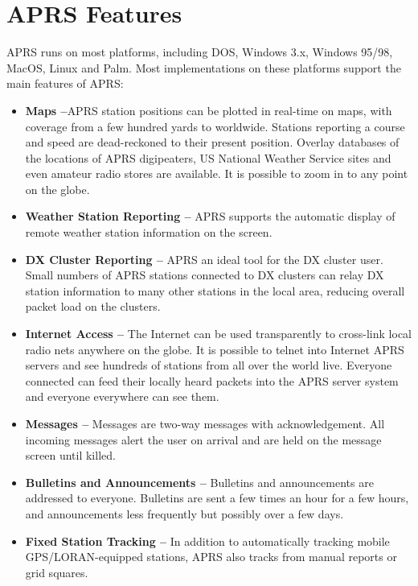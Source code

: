 \documentclass{scrreprt}[letter]
\begin{document}
\section{APRS Features}

APRS runs on most platforms, including DOS, Windows 3.x, Windows
95/98, MacOS, Linux and Palm. Most implementations on these platforms
support the main features of APRS:

\begin{itemize}

\item \textbf{Maps --}APRS station positions can be plotted in real-time on maps,
with coverage from a few hundred yards to worldwide. Stations reporting
a course and speed are dead-reckoned to their present position. Overlay
databases of the locations of APRS digipeaters, US National Weather
Service sites and even amateur radio stores are available. It is possible to
zoom in to any point on the globe.


\item \textbf{Weather Station Reporting --} APRS supports the automatic display of
remote weather station information on the screen.

\item \textbf{DX Cluster Reporting --} APRS an ideal tool for the DX cluster user.
Small numbers of APRS stations connected to DX clusters can relay DX
station information to many other stations in the local area, reducing
overall packet load on the clusters.

\item \textbf{Internet Access --} The Internet can be used transparently to cross-link
local radio nets anywhere on the globe. It is possible to telnet into
Internet APRS servers and see hundreds of stations from all over the
world live. Everyone connected can feed their locally heard packets into
the APRS server system and everyone everywhere can see them.

\item \textbf{Messages --} Messages are two-way messages with acknowledgement.
All incoming messages alert the user on arrival and are held on the
message screen until killed.


\item \textbf{Bulletins and Announcements --} Bulletins and announcements are
addressed to everyone. Bulletins are sent a few times an hour for a few
hours, and announcements less frequently but possibly over a few days.

\item \textbf{Fixed Station Tracking --} In addition to automatically tracking mobile
GPS/LORAN-equipped stations, APRS also tracks from manual reports
or grid squares.


\end{itemize}
\end{document}
